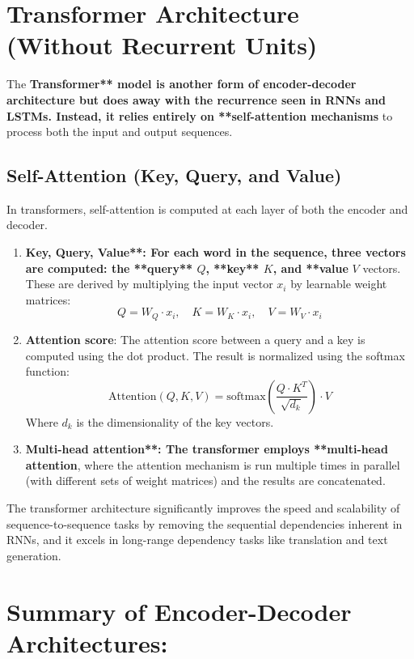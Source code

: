 \documentclass[10pt]{article}
\begin{document}
\section{ Transformer Architecture (Without Recurrent Units)}

The {\bf Transformer** model is another form of encoder-decoder architecture but does away with the recurrence seen in RNNs and LSTMs. Instead, it relies entirely on **self-attention mechanisms} to process both the input and output sequences.

\subsection{ Self-Attention (Key, Query, and Value)}
In transformers, self-attention is computed at each layer of both the encoder and decoder.

\begin{enumerate}
   \item {\bf Key, Query, Value**: For each word in the sequence, three vectors are computed: the **query** \( Q \), **key** \( K \), and **value} \( V \) vectors. These are derived by multiplying the input vector \( x_i \) by learnable weight matrices:
      \[
      Q = W_Q \cdot x_i, \quad K = W_K \cdot x_i, \quad V = W_V \cdot x_i
      \]
   
   \item {\bf Attention score}: The attention score between a query and a key is computed using the dot product. The result is normalized using the softmax function:
      \[
      \text{Attention}(Q, K, V) = \text{softmax}\left(\frac{Q \cdot K^T}{\sqrt{d_k}}\right) \cdot V
      \]
      Where \( d_k \) is the dimensionality of the key vectors.
   
   \item {\bf Multi-head attention**: The transformer employs **multi-head attention}, where the attention mechanism is run multiple times in parallel (with different sets of weight matrices) and the results are concatenated.
\end{enumerate}

The transformer architecture significantly improves the speed and scalability of sequence-to-sequence tasks by removing the sequential dependencies inherent in RNNs, and it excels in long-range dependency tasks like translation and text generation.

\section{ Summary of Encoder-Decoder Architectures:}
\end{document}
